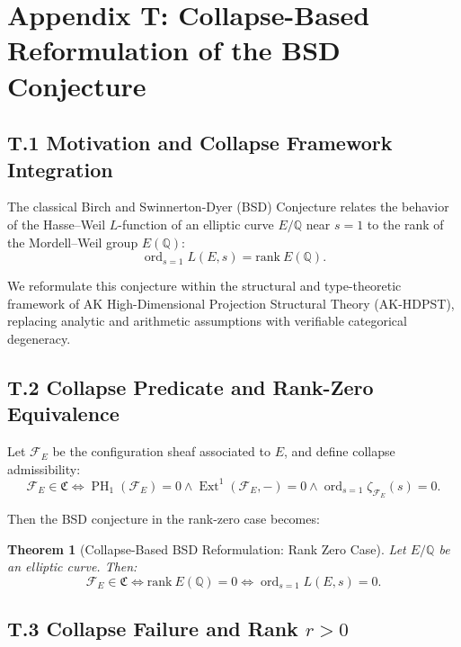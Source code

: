 \documentclass[11pt]{article}
\newtheorem{theorem}{Theorem}[section]
\DeclareMathOperator{\Ext}{Ext}
\DeclareMathOperator{\PH}{PH}
\newcommand{\ord}{\operatorname{ord}}
\begin{document}
\appendix
\section*{Appendix T: Collapse-Based Reformulation of the BSD Conjecture}

\subsection*{T.1 Motivation and Collapse Framework Integration}

The classical Birch and Swinnerton-Dyer (BSD) Conjecture relates the behavior of the Hasse–Weil \( L \)-function of an elliptic curve \( E/\mathbb{Q} \) near \( s = 1 \) to the rank of the Mordell–Weil group \( E(\mathbb{Q}) \):
\[
\ord_{s=1} L(E, s) = \mathrm{rank}~E(\mathbb{Q}).
\]

We reformulate this conjecture within the structural and type-theoretic framework of AK High-Dimensional Projection Structural Theory (AK-HDPST), replacing analytic and arithmetic assumptions with verifiable categorical degeneracy.

\subsection*{T.2 Collapse Predicate and Rank-Zero Equivalence}

Let \( \mathcal{F}_E \) be the configuration sheaf associated to \( E \), and define collapse admissibility:
\[
\mathcal{F}_E \in \mathfrak{C} \iff \PH_1(\mathcal{F}_E) = 0 \land \Ext^1(\mathcal{F}_E, -) = 0 \land \ord_{s=1} \zeta_{\mathcal{F}_E}(s) = 0.
\]

Then the BSD conjecture in the rank-zero case becomes:

\begin{theorem}[Collapse-Based BSD Reformulation: Rank Zero Case]
\label{thm:bsd-collapse-reform}
Let \( E/\mathbb{Q} \) be an elliptic curve. Then:
\[
\mathcal{F}_E \in \mathfrak{C} \iff \mathrm{rank}~E(\mathbb{Q}) = 0 \iff \ord_{s=1} L(E, s) = 0.
\]
\end{theorem}

\subsection*{T.3 Collapse Failure and Rank \texorpdfstring{\( r > 0 \)}{r > 0}}
\end{document}
